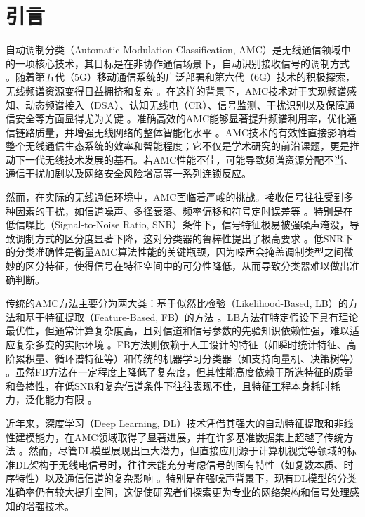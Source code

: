 \documentclass[conference]{IEEEtran}
\begin{document}
\section{引言}
自动调制分类（Automatic Modulation Classification, AMC）是无线通信领域中的一项核心技术，其目标是在非协作通信场景下，自动识别接收信号的调制方式 \cite{[5]}\cite{[6]}。随着第五代（5G）移动通信系统的广泛部署和第六代（6G）技术的积极探索，无线频谱资源变得日益拥挤和复杂 \cite{[12]}\cite{[21]}\cite{[22_MISSING]}。在这样的背景下，AMC技术对于实现频谱感知、动态频谱接入（DSA）、认知无线电（CR）、信号监测、干扰识别以及保障通信安全等方面显得尤为关键 \cite{b1}\cite{[5]}\cite{[23_MISSING]}\cite{[24_MISSING]}\cite{[25_MISSING]}。准确高效的AMC能够显著提升频谱利用率，优化通信链路质量，并增强无线网络的整体智能化水平 \cite{b1}\cite{[6]}。AMC技术的有效性直接影响着整个无线通信生态系统的效率和智能程度；它不仅是学术研究的前沿课题，更是推动下一代无线技术发展的基石。若AMC性能不佳，可能导致频谱资源分配不当、通信干扰加剧以及网络安全风险增高等一系列连锁反应。

然而，在实际的无线通信环境中，AMC面临着严峻的挑战。接收信号往往受到多种因素的干扰，如信道噪声、多径衰落、频率偏移和符号定时误差等 \cite{[5]}\cite{[26_MISSING]}\cite{[27_MISSING]}。特别是在低信噪比（Signal-to-Noise Ratio, SNR）条件下，信号特征极易被强噪声淹没，导致调制方式的区分度显著下降，这对分类器的鲁棒性提出了极高要求 \cite{b1}\cite{[9_MISSING]}\cite{[28_MISSING]}\cite{[29_MISSING]}\cite{[30_MISSING]}。低SNR下的分类准确性是衡量AMC算法性能的关键瓶颈，因为噪声会掩盖调制类型之间微妙的区分特征，使得信号在特征空间中的可分性降低，从而导致分类器难以做出准确判断。

传统的AMC方法主要分为两大类：基于似然比检验（Likelihood-Based, LB）的方法和基于特征提取（Feature-Based, FB）的方法 \cite{[5]}\cite{[8]}\cite{[10]}。LB方法在特定假设下具有理论最优性，但通常计算复杂度高，且对信道和信号参数的先验知识依赖性强，难以适应复杂多变的实际环境 \cite{[5]}\cite{[8]}\cite{[10]}。FB方法则依赖于人工设计的特征（如瞬时统计特征、高阶累积量、循环谱特征等）和传统的机器学习分类器（如支持向量机、决策树等） \cite{[10]}\cite{[27_MISSING]}。虽然FB方法在一定程度上降低了复杂度，但其性能高度依赖于所选特征的质量和鲁棒性，在低SNR和复杂信道条件下往往表现不佳，且特征工程本身耗时耗力，泛化能力有限 \cite{[9_MISSING]}\cite{[10]}\cite{[31_MISSING]}。

近年来，深度学习（Deep Learning, DL）技术凭借其强大的自动特征提取和非线性建模能力，在AMC领域取得了显著进展，并在许多基准数据集上超越了传统方法 \cite{[10]}\cite{b4}\cite{[12]}。然而，尽管DL模型展现出巨大潜力，但直接应用源于计算机视觉等领域的标准DL架构于无线电信号时，往往未能充分考虑信号的固有特性（如复数本质、时序特性）以及通信信道的复杂影响 \cite{[5]}\cite{b4}。特别是在强噪声背景下，现有DL模型的分类准确率仍有较大提升空间，这促使研究者们探索更为专业的网络架构和信号处理感知的增强技术。
\end{document}
